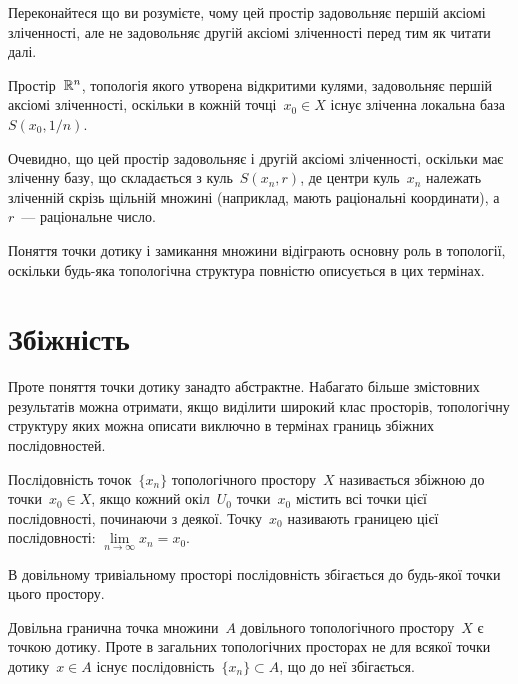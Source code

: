 \begin{exercise}
Переконайтеся що ви розумієте, чому цей простір задовольняє першій аксіомі
зліченності, але не задовольняє другій аксіомі зліченності перед тим як читати далі.
\end{exercise}

\begin{example}
Простір~$\mathbb{R}^n$, топологія якого утворена
відкритими кулями, задовольняє першій аксіомі зліченності,
оскільки в кожній точці~$x_0 \in X$ існує зліченна локальна база
$S(x_0, 1 / n)$.

Очевидно, що цей простір задовольняє і другій
аксіомі зліченності, оскільки має зліченну базу, що
складається з куль~$S(x_n, r)$, де центри куль~$x_n$ належать
зліченній скрізь щільній множині (наприклад, мають
раціональні координати), а~$r$~--- раціональне число.
\end{example}

Поняття точки дотику і замикання множини відіграють
основну роль в топології, оскільки будь-яка топологічна
структура повністю описується в цих термінах.

\section{Збіжність}

Проте поняття точки дотику занадто абстрактне.
Набагато більше змістовних результатів можна отримати,
якщо виділити широкий клас просторів, топологічну
структуру яких можна описати виключно в термінах
границь збіжних послідовностей.

\begin{definition}
Послідовність точок~$\{x_n\}$ топологічного
простору~$X$ називається збіжною до точки~$x_0 \in X$, якщо
кожний окіл~$U_0$ точки~$x_0$ містить всі точки цієї
послідовності, починаючи з деякої. Точку~$x_0$ називають
границею цієї послідовності: $\lim\limits_{n \to \infty} x_n = x_0$.
\end{definition}

\begin{example}
В довільному тривіальному просторі
послідовність збігається до будь-якої точки цього простору.
\end{example}

Довільна гранична точка множини~$A$ довільного
топологічного простору~$X$ є точкою дотику. Проте в
загальних топологічних просторах не для всякої точки
дотику~$x \in A$ існує послідовність~$\{x_n\} \subset A$, що до неї
збігається.

